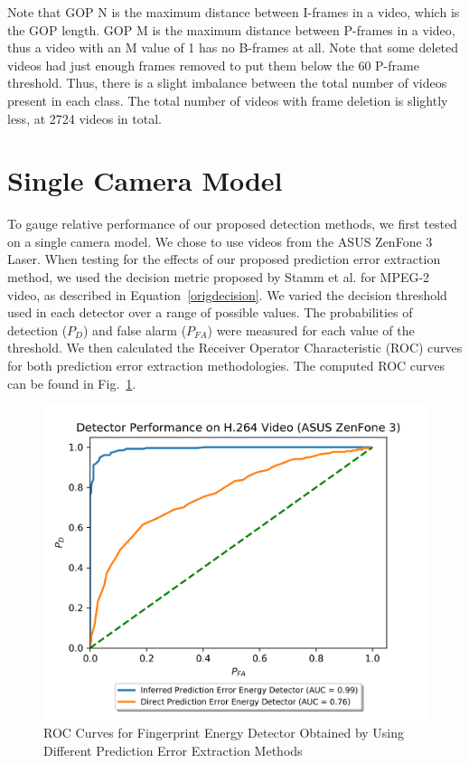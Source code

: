 Note that GOP N is the maximum distance between I-frames in a video, which is the GOP length. GOP M is the maximum distance between P-frames in a video, thus a video with an M value of 1 has no B-frames at all. Note that some deleted videos had just enough frames removed to put them below the 60 P-frame threshold. Thus, there is a slight imbalance between the total number of videos present in each class. The total number of videos with frame deletion is slightly less, at 2724 videos in total.

\section{Single Camera Model}

To gauge relative performance of our proposed detection methods, we first tested on a single camera model. We chose to use videos from the ASUS ZenFone 3 Laser. When testing for the effects of our proposed prediction error extraction method, we used the decision metric proposed by Stamm et al. \cite{stamm} for MPEG-2 video, as described in Equation~\ref{origdecision}. We varied the decision threshold used in each detector over a range of possible values. The probabilities of detection ($P_{D}$) and false alarm ($P_{FA}$) were measured for each value of the threshold. We then calculated the Receiver Operator Characteristic (ROC) curves for both prediction error extraction methodologies. The computed ROC curves can be found in Fig.~\ref{perrorExtractASUS}.
%
\begin{figure}[htbp]
\centerline{\includegraphics[width=0.7\linewidth]{ExperimentalResults/new_perror_extract_roc_asus.png}}
\caption{ROC Curves for Fingerprint Energy Detector Obtained by Using Different Prediction Error Extraction Methods}
\label{perrorExtractASUS}
\end{figure} 
